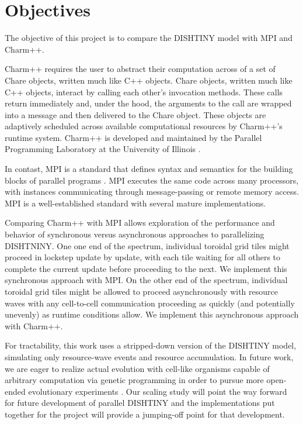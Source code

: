 \section{Objectives}

The objective of this project is to compare  the DISHTINY model with MPI and Charm++.

Charm++ requires the user to abstract their computation across of a set of Chare objects, written much like C++ objects.
Chare objects, written much like C++ objects, interact by calling each other's invocation methods.
These calls return immediately and, under the hood, the arguments to the call are wrapped into a message and then delivered to the Chare object.
These objects are adaptively scheduled across available computational resources by Charm++'s runtime system.
Charm++ is developed and maintained by the Parallel Programming Laboratory at the University of Illinois \cite{kale1993charm+}.

In contast, MPI is a standard that defines syntax and semantics for the building blocks of parallel programs \cite{Forum:1994:MMI:898758}.
MPI executes the same code across many processors, with instances communicating through message-passing or remote memory access.
MPI is a well-established standard with several mature implementations.

Comparing Charm++ with MPI allows exploration of the performance and behavior of synchronous versus asynchronous approaches to parallelizing DISHTNINY.
One one end of the spectrum, individual toroidal grid tiles might proceed in lockstep update by update, with each tile waiting for all others to complete the current update before proceeding to the next.
We implement this synchronous approach with MPI.
On the other end of the spectrum, individual toroidal grid tiles might be allowed to proceed asynchronously with resource waves with any cell-to-cell communication proceeding as quickly (and potentially unevenly) as runtime conditions allow.
We implement this asynchronous approach with Charm++.

For tractability, this work uses a stripped-down version of the DISHTINY model, simulating only resource-wave events and resource accumulation.
In future work, we are eager to realize actual evolution with cell-like organisms capable of arbitrary computation via genetic programming in order to pursue more open-ended evolutionary experiments \cite{lalejini2018evolving}.
Our scaling study will point the way forward for future development of parallel DISHTINY and the implementations put together for the project will provide a jumping-off point for that development.
